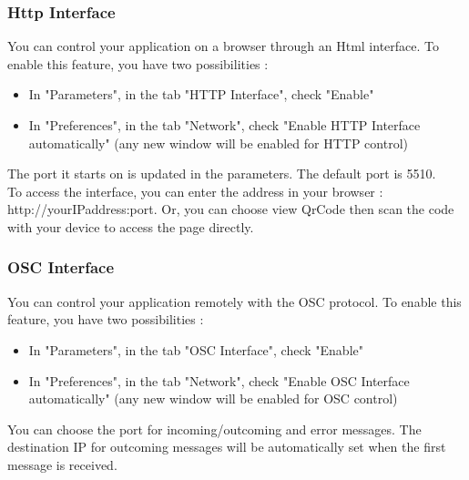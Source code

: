 \documentclass[a4paper]{article}
\begin{document}
\subsubsection{Http Interface}
	You can control your application on a browser through an Html interface. To enable this feature, you have two possibilities :
	\begin{itemize}
	\item In "Parameters", in the tab "HTTP Interface", check "Enable"
	\item In "Preferences", in the tab "Network", check "Enable HTTP Interface automatically" (any new window will be enabled for HTTP control)
	\end{itemize}
	
The port it starts on is updated in the parameters. The default port is 5510.\\
	To access the interface, you can enter the address in your browser : http://yourIPaddress:port.	
	Or, you can choose view QrCode then scan the code with your device to access the page directly. 

\subsubsection{OSC Interface}
	You can control your application remotely with the OSC protocol. 
	To enable this feature, you have two possibilities :
	\begin{itemize}
	\item In "Parameters", in the tab "OSC Interface", check "Enable"
	\item In "Preferences", in the tab "Network", check "Enable OSC Interface automatically" (any new window will be enabled for OSC control)
	\end{itemize}
	You can choose the port for incoming/outcoming and error messages. The destination IP for outcoming messages will be automatically set when the first message is received. 

\end{document}

